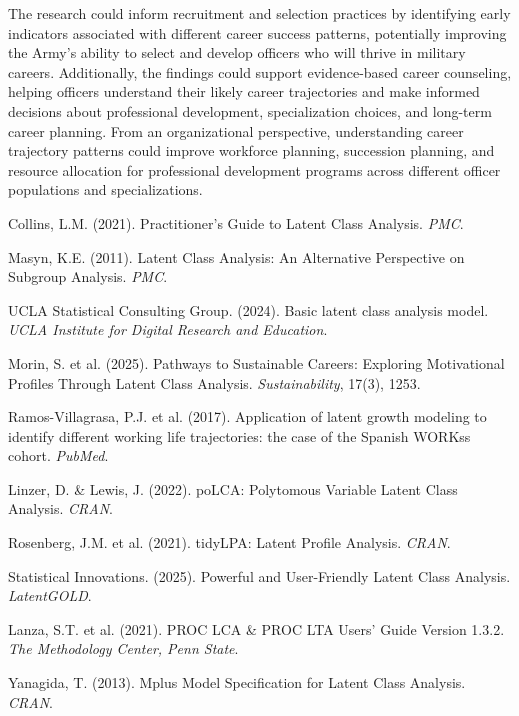 \documentclass[main.tex]{subfiles}
\begin{document}
The research could inform recruitment and selection practices by identifying early indicators associated with different career success patterns, potentially improving the Army's ability to select and develop officers who will thrive in military careers. Additionally, the findings could support evidence-based career counseling, helping officers understand their likely career trajectories and make informed decisions about professional development, specialization choices, and long-term career planning. From an organizational perspective, understanding career trajectory patterns could improve workforce planning, succession planning, and resource allocation for professional development programs across different officer populations and specializations.


\begin{thebibliography}{20}

Collins, L.M. (2021). Practitioner's Guide to Latent Class Analysis. \textit{PMC}. \

Masyn, K.E. (2011). Latent Class Analysis: An Alternative Perspective on Subgroup Analysis. \textit{PMC}. \

UCLA Statistical Consulting Group. (2024). Basic latent class analysis model. \textit{UCLA Institute for Digital Research and Education}.

Morin, S. et al. (2025). Pathways to Sustainable Careers: Exploring Motivational Profiles Through Latent Class Analysis. \textit{Sustainability}, 17(3), 1253.

Ramos-Villagrasa, P.J. et al. (2017). Application of latent growth modeling to identify different working life trajectories: the case of the Spanish WORKss cohort. \textit{PubMed}.

Linzer, D. \& Lewis, J. (2022). poLCA: Polytomous Variable Latent Class Analysis. \textit{CRAN}.

Rosenberg, J.M. et al. (2021). tidyLPA: Latent Profile Analysis. \textit{CRAN}.

Statistical Innovations. (2025). Powerful and User-Friendly Latent Class Analysis. \textit{LatentGOLD}.

Lanza, S.T. et al. (2021). PROC LCA \& PROC LTA Users' Guide Version 1.3.2. \textit{The Methodology Center, Penn State}.

Yanagida, T. (2013). Mplus Model Specification for Latent Class Analysis. \textit{CRAN}.


\end{thebibliography}
\end{document}
